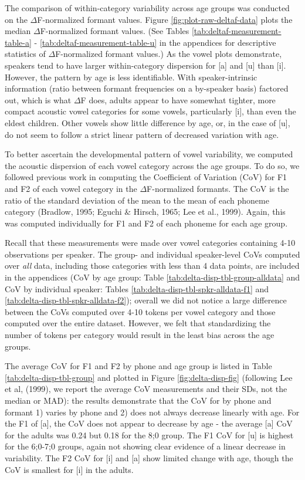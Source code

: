 \documentclass[
]{article}
\begin{document}
The comparison of within-category variability across age groups was conducted on the \(\Delta\)F-normalized formant values. Figure \ref{fig:plot-raw-deltaf-data} plots the median \(\Delta\)F-normalized formant values. (See Tables \ref{tab:deltaf-measurement-table-a} - \ref{tab:deltaf-measurement-table-u} in the appendices for descriptive statistics of \(\Delta\)F-normalized formant values.) As the vowel plots demonstrate, speakers tend to have larger within-category dispersion for {[}a{]} and {[}u{]} than {[}i{]}. However, the pattern by age is less identifiable. With speaker-intrinsic information (ratio between formant frequencies on a by-speaker basis) factored out, which is what \(\Delta\)F does, adults appear to have somewhat tighter, more compact acoustic vowel categories for some vowels, particularly {[}i{]}, than even the eldest children. Other vowels show little difference by age, or, in the case of {[}u{]}, do not seem to follow a strict linear pattern of decreased variation with age.

To better ascertain the developmental pattern of vowel variability, we computed the acoustic dispersion of each vowel category across the age groups. To do so, we followed previous work in computing the Coefficient of Variation (CoV) for F1 and F2 of each vowel category in the \(\Delta\)F-normalized formants. The CoV is the ratio of the standard deviation of the mean to the mean of each phoneme category (Bradlow, 1995; Eguchi \& Hirsch, 1965; Lee et al., 1999). Again, this was computed individually for F1 and F2 of each phoneme for each age group.

Recall that these measurements were made over vowel categories containing 4-10 observations per speaker. The group- and individual speaker-level CoVs computed over \emph{all} data, including those categories with less than 4 data points, are included in the appendices (CoV by age group: Table \ref{tab:delta-disp-tbl-group-alldata} and CoV by individual speaker: Tables \ref{tab:delta-disp-tbl-spkr-alldata-f1} and \ref{tab:delta-disp-tbl-spkr-alldata-f2}); overall we did not notice a large difference between the CoVs computed over 4-10 tokens per vowel category and those computed over the entire dataset. However, we felt that standardizing the number of tokens per category would result in the least bias across the age groups.

The average CoV for F1 and F2 by phone and age group is listed in Table \ref{tab:delta-disp-tbl-group} and plotted in Figure \ref{fig:delta-disp-fig} (following Lee et al, (1999), we report the average CoV measurements and their SDs, not the median or MAD): the results demonstrate that the CoV for by phone and formant 1) varies by phone and 2) does not always decrease linearly with age. For the F1 of {[}a{]}, the CoV does not appear to decrease by age - the average {[}a{]} CoV for the adults was 0.24 but 0.18 for the 8;0 group. The F1 CoV for {[}u{]} is highest for the 6;0-7;0 groups, again not showing clear evidence of a linear decrease in variability. The F2 CoV for {[}i{]} and {[}a{]} show limited change with age, though the CoV is smallest for {[}i{]} in the adults.
\end{document}
